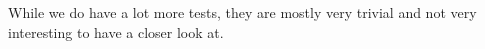 While we do have a lot more tests, they are mostly very trivial and not very interesting to have a closer look at.





